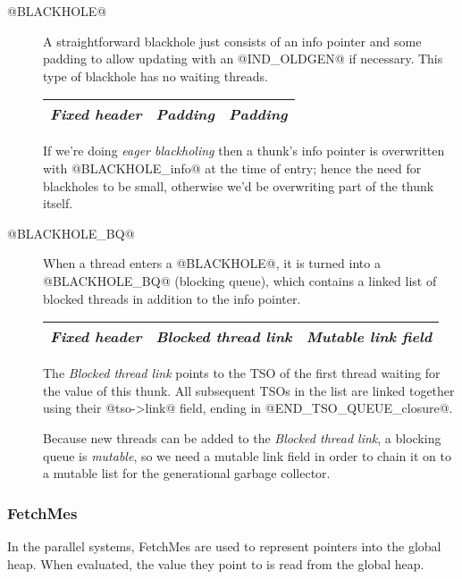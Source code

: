\documentclass[11pt]{article}
\newcommand{\Subsubsection}[2]{\subsubsection{#1}\label{sec:#2}}
\begin{document}
\begin{description}

\item[@BLACKHOLE@]
A straightforward blackhole just consists of an info pointer and some
padding to allow updating with an @IND_OLDGEN@ if necessary.  This
type of blackhole has no waiting threads.

\begin{center}
\begin{tabular}{|l|l|l|}
\hline 
\emph{Fixed header} & \emph{Padding} & \emph{Padding} \\
\hline
\end{tabular}
\end{center}

If we're doing \emph{eager blackholing} then a thunk's info pointer is
overwritten with @BLACKHOLE_info@ at the time of entry; hence the need
for blackholes to be small, otherwise we'd be overwriting part of the
thunk itself.

\item[@BLACKHOLE\_BQ@] 
When a thread enters a @BLACKHOLE@, it is turned into a @BLACKHOLE_BQ@
(blocking queue), which contains a linked list of blocked threads in
addition to the info pointer.

\begin{center}
\begin{tabular}{|l|l|l|}
\hline 
\emph{Fixed header} & \emph{Blocked thread link} & \emph{Mutable link field} \\
\hline
\end{tabular}
\end{center}

The \emph{Blocked thread link} points to the TSO of the first thread
waiting for the value of this thunk.  All subsequent TSOs in the list
are linked together using their @tso->link@ field, ending in
@END_TSO_QUEUE_closure@.

Because new threads can be added to the \emph{Blocked thread link}, a
blocking queue is \emph{mutable}, so we need a mutable link field in
order to chain it on to a mutable list for the generational garbage
collector.

\end{description}

\Subsubsection{FetchMes}{FETCHME} 

In the parallel systems, FetchMes are used to represent pointers into
the global heap.  When evaluated, the value they point to is read from
the global heap.
\end{document}
